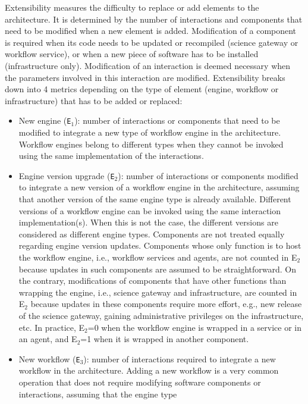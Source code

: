 \documentclass[preprint,3p,twocolumn]{elsarticle}
\begin{document}
Extensibility measures the difficulty to replace or add elements to
the architecture. It is determined by the number of interactions and
components that need to be modified when a new element is
added. Modification of a component is required when its code needs to
be updated or recompiled (science gateway or workflow service), or
when a new piece of software has to be installed (infrastructure
only). Modification of an interaction is deemed necessary when the
parameters involved in this interaction are modified.  Extensibility
breaks down into 4 metrics depending on the type of element (engine,
workflow or infrastructure) that has to be added or replaced:
\begin{itemize}[leftmargin=0cm,itemindent=0.35cm,itemsep=0cm]
\item New engine (\texttt{E$_1$}): number of interactions or
  components that need to be modified to integrate a new type of
  workflow engine in the architecture. Workflow engines belong to
  different types when they cannot be invoked using the same
  implementation of the interactions.
 \item Engine version upgrade (\texttt{E$_2$}): number of interactions
  or components modified to integrate a new version of a workflow
  engine in the architecture, assuming that another version of the
  same engine type is already available. Different versions of a
  workflow engine can be invoked using the same interaction
  implementation(s). When this is not the case, the different versions
  are considered as different engine types. Components are not treated
  equally regarding engine version updates. Components whose only
  function is to host the workflow engine, i.e., workflow services and
  agents, are not counted in E$_2$ because updates in such components
  are assumed to be straightforward. On the contrary, modifications of
  components that have other functions than wrapping the engine,
  i.e., science gateway and infrastructure, are counted in E$_2$
  because updates in these components require more effort, e.g., new
  release of the science gateway, gaining administrative privileges on
  the infrastructure, etc. In practice, E$_2$=0 when the workflow
  engine is wrapped in a service or in an agent, and E$_2$=1 when it is
  wrapped in another component.  
\item New workflow (\texttt{E$_3$}): number of interactions required
  to integrate a new workflow in the architecture. Adding a new
  workflow is a very common operation that does not require modifying
  software components or interactions, assuming that the engine type

\end{itemize}
\end{document}
